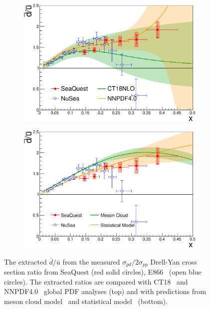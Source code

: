 \documentclass[reprint,aps,unsortedaddress,superscriptaddress,prc,floatfix,showpacs,linenumbers,final]{revtex4-2}
\begin{document}
\begin{figure}[htpb!]
	\centering
	\begin{subfigure}{\linewidth}
		\includegraphics[width=\linewidth]{E906_E866_dbarubar_PDF.pdf}
	\end{subfigure}
	\begin{subfigure}{\linewidth}
		\includegraphics[width=\linewidth]{E906_E866_dbarubar.pdf}
	\end{subfigure}
	\caption{The extracted $\bar{d}/\bar{u}$ from the measured $\sigma_{pd}/2\sigma_{pp}$ Drell-Yan cross section ratio
		from SeaQuest (red solid circles), E866~\cite{towell2001} (open blue circles).
		The extracted ratios are compared with CT18~\cite{hou2021} and NNPDF4.0~\cite{ball2022a} global PDF analyses (top)
		and with predictions from meson cloud model~\cite{alberg2022} and statistical model~\cite{soffer2019} (bottom).}
	\label{fig:e906_e866_dbarubar}
\end{figure}
\end{document}
